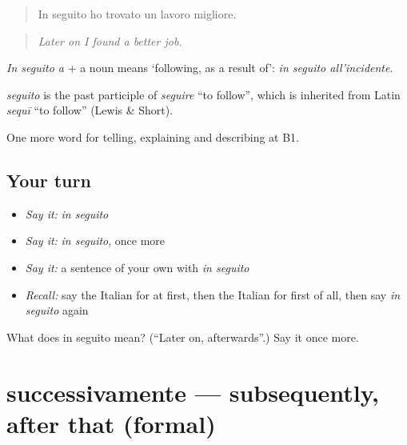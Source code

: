 \begin{quote}
In seguito ho trovato un lavoro migliore.
\end{quote}

\begin{quote}
\emph{Later on I found a better job.}
\end{quote}

\emph{In seguito a} + a noun means ‘following, as a result of’: \emph{in seguito all'incidente}.

\begin{cousinweb}
\emph{seguito} is the past participle of \emph{seguire} \textquotedblleft{}to follow\textquotedblright{}, which is inherited from Latin \emph{sequī} \textquotedblleft{}to follow\textquotedblright{} (Lewis \& Short).
\end{cousinweb}

\begin{grammarlens}[title={What you've built}]
One more word for telling, explaining and describing at B1.
\end{grammarlens}

\subsection*{Your turn}
\begin{itemize}
\raggedright
  \item \emph{Say it:} \emph{in seguito}
  \item \emph{Say it:} \emph{in seguito}, once more
  \item \emph{Say it:} a sentence of your own with \emph{in seguito}
  \item \emph{Recall:} say the Italian for at first, then the Italian for first of all, then say \emph{in seguito} again
\end{itemize}

\begin{tcolorbox}[breakable,colback=teal!4,colframe=teal!35!black,title={Before you move on}]
What does in seguito mean? (\textquotedblleft{}Later on, afterwards\textquotedblright{}.) Say it once more.
\end{tcolorbox}
\section[successivamente]{successivamente — subsequently, after that (formal)}

\label{lesson:IT-C273-successivamente}



